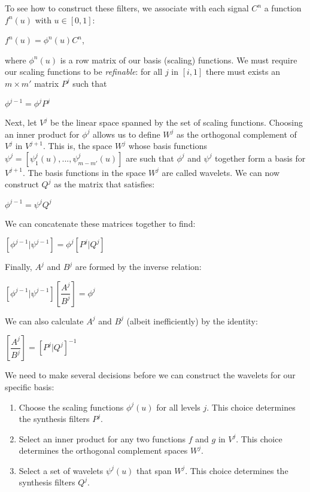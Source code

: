 \documentclass[11pt]{article}
\begin{document}
To see how to construct these filters, we associate with each signal $C^{n}$ a function $f^{n}(u)$ with $u \in [0, 1]$:
\begin{center}
$f^{n}(u) = \phi^{n}(u)C^{n}$,
\end{center}
where $\phi^{n}(u)$ is a row matrix of our basis (scaling) functions. We must require our scaling functions to be \emph{refinable}: for all $j$ in $[i, 1]$ there must exists an $m \times m'$ matrix $P^{j}$ such that
\begin{center}
$\phi^{j-1} = \phi^{j} P^{j}$
\end{center}

Next, let $V^{j}$ be the linear space spanned by the set of scaling functions. Choosing an inner product for $\phi^{j}$ allows us to define $W^{j}$ as the orthogonal complement of $V^{j}$ in $V^{j+1}$. This is, the space $W^{j}$ whose basis functions $\psi^{j} = [\psi^{j}_{1}(u), ..., \psi^{j}_{m-m'}(u)]$ are such that $\phi^{j}$ and $\psi^{j}$ together form a basis for $V^{j+1}$. The basis functions in the space $W^{j}$ are called wavelets. We can now construct $Q^{j}$ as the matrix that satisfies:
\begin{center}
$\phi^{j-1} = \psi^{j}Q^{j}$
\end{center}
We can concatenate these matrices together to find:
\begin{center}
$[\phi^{j-1} | \psi^{j-1} ] = \phi^{j} [P^{j} | Q^{j} ]$
\end{center}
Finally, $A^{j}$ and $B^{j}$ are formed by the inverse relation:
\begin{center}
$[\phi^{j-1} | \psi^{j-1} ] \left[\dfrac{A^{j}}{B^{j}}\right] = \phi^{j}$
\end{center}
We can also calculate $A^{j}$ and $B^{j}$ (albeit inefficiently) by the identity:
\begin{center}
$ \left[\dfrac{A^{j}}{B^{j}}\right] = [P^{j} | Q^{j} ]^{-1}$
\end{center}

We need to make several decisions before we can construct the wavelets for our specific basis:
\begin{enumerate}
\item Choose the scaling functions $\phi^{j}(u)$ for all levels $j$. This choice determines the synthesis filters $P^{j}$.
\item Select an inner product for any two functions $f$ and $g$ in $V^{j}$. This choice determines the orthogonal complement spaces $W^{j}$.
\item Select a set of wavelets $\psi^{j}(u)$ that span $W^{j}$. This choice determines the synthesis filters $Q^{j}$.
\end{enumerate}
\end{document}
